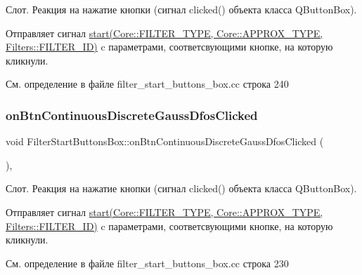 Слот. Реакция на нажатие кнопки (сигнал clicked() объекта класса Q\+Button\+Box).

Отправляет сигнал \hyperlink{class_filter_start_buttons_box_ac6e2a6555f1d388391f188f834b8e753}{start(\+Core\+::\+F\+I\+L\+T\+E\+R\+\_\+\+T\+Y\+P\+E, Core\+::\+A\+P\+P\+R\+O\+X\+\_\+\+T\+Y\+P\+E, Filters\+::\+F\+I\+L\+T\+E\+R\+\_\+\+I\+D)} c параметрами, соответсвующими кнопке, на которую кликнули. 

См. определение в файле filter\+\_\+start\+\_\+buttons\+\_\+box.\+cc строка 240

\hypertarget{class_filter_start_buttons_box_a928032e48d077e6e05f522c5a63efde3}{}\label{class_filter_start_buttons_box_a928032e48d077e6e05f522c5a63efde3} 
\subsubsection{\texorpdfstring{on\+Btn\+Continuous\+Discrete\+Gauss\+Dfos\+Clicked}{onBtnContinuousDiscreteGaussDfosClicked}}
{\footnotesize\ttfamily void Filter\+Start\+Buttons\+Box\+::on\+Btn\+Continuous\+Discrete\+Gauss\+Dfos\+Clicked (\begin{DoxyParamCaption}{ }\end{DoxyParamCaption})\hspace{0.3cm}{\ttfamily [private]}, {\ttfamily [slot]}}

Слот. Реакция на нажатие кнопки (сигнал clicked() объекта класса Q\+Button\+Box).

Отправляет сигнал \hyperlink{class_filter_start_buttons_box_ac6e2a6555f1d388391f188f834b8e753}{start(\+Core\+::\+F\+I\+L\+T\+E\+R\+\_\+\+T\+Y\+P\+E, Core\+::\+A\+P\+P\+R\+O\+X\+\_\+\+T\+Y\+P\+E, Filters\+::\+F\+I\+L\+T\+E\+R\+\_\+\+I\+D)} c параметрами, соответсвующими кнопке, на которую кликнули. 

См. определение в файле filter\+\_\+start\+\_\+buttons\+\_\+box.\+cc строка 230

\hypertarget{class_filter_start_buttons_box_a165d56507e4ed134260bbe37bf9fd858}{}\label{class_filter_start_buttons_box_a165d56507e4ed134260bbe37bf9fd858} 
